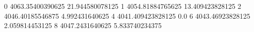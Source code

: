 0 4063.35400390625 21.944580078125
1 4054.81884765625 13.409423828125
2 4046.40185546875 4.992431640625
4 4041.409423828125 0.0
6 4043.46923828125 2.059814453125
8 4047.2431640625 5.833740234375
